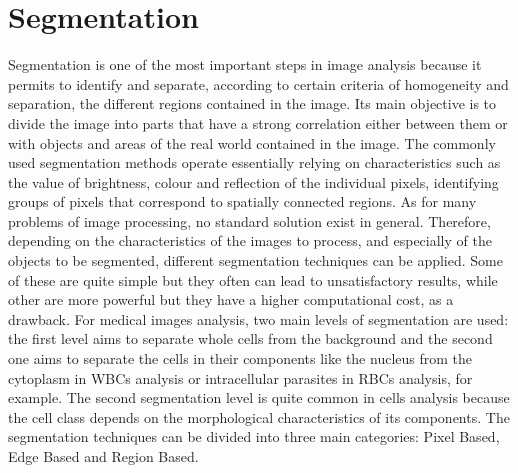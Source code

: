 \documentclass[final,a4paper,12pt,english]{UnicaPhdThesis3}
\begin{document}
\chapter{Segmentation} %
Segmentation is one of the most important steps in image analysis because it permits to identify and separate, according to certain criteria of homogeneity and separation, the different regions contained in the image. Its main objective is to divide the image into parts that have a strong correlation either between them or with objects and areas of the real world contained in the image. The commonly used segmentation methods operate essentially relying on characteristics such as the value of brightness, colour and reflection of the individual pixels, identifying groups of pixels that correspond to spatially connected regions. 
As for many problems of image processing, no standard solution exist in general. Therefore, depending on the characteristics of the images to process, and especially of the objects to be segmented, different segmentation techniques can be applied. Some of these are quite simple but they often can lead to unsatisfactory results, while other are more powerful but they have a higher computational cost, as a drawback. For medical images analysis, two main levels of segmentation are used: the first level aims to separate whole cells from the background and the second one aims to separate the cells in their components like the nucleus from the cytoplasm in WBCs analysis or intracellular parasites in RBCs analysis, for example. The second segmentation level is quite common in cells analysis because the cell class depends on the morphological characteristics of its components. The segmentation techniques can be divided into three main categories: Pixel Based, Edge Based and Region Based.
\end{document}
